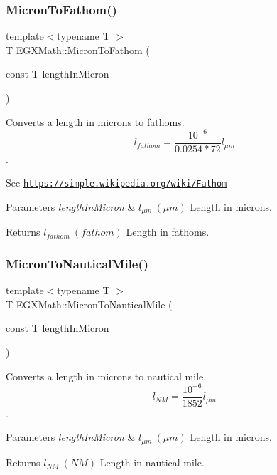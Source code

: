 \subsubsection{\texorpdfstring{Micron\+To\+Fathom()}{MicronToFathom()}}
{\footnotesize\ttfamily template$<$typename T $>$ \\
T E\+G\+X\+Math\+::\+Micron\+To\+Fathom (\begin{DoxyParamCaption}\item[{const T}]{length\+In\+Micron }\end{DoxyParamCaption})}



Converts a length in microns to fathoms. \[ l_{fathom}= \frac{10^{-6}}{0.0254 * 72} l_{\mu m} \]. 

See \href{https://simple.wikipedia.org/wiki/Fathom}{\tt https\+://simple.\+wikipedia.\+org/wiki/\+Fathom} 
\begin{DoxyParams}{Parameters}
{\em length\+In\+Micron} & $ l_{\mu m}\ (\mu m)$ Length in microns. \\
\hline
\end{DoxyParams}
\begin{DoxyReturn}{Returns}
$ l_{fathom}\ (fathom)$ Length in fathoms. 
\end{DoxyReturn}
\mbox{\label{group___e_g_x_math-_conversions-_length_conversions-_non-_s_i-_micron-_nautical_gaa3944ed4bca9dcd37c3043d44cc36bf1}} 
\subsubsection{\texorpdfstring{Micron\+To\+Nautical\+Mile()}{MicronToNauticalMile()}}
{\footnotesize\ttfamily template$<$typename T $>$ \\
T E\+G\+X\+Math\+::\+Micron\+To\+Nautical\+Mile (\begin{DoxyParamCaption}\item[{const T}]{length\+In\+Micron }\end{DoxyParamCaption})}



Converts a length in microns to nautical mile. \[ l_{NM}= \frac{10^{-6}}{1852} l_{\mu m} \]. 


\begin{DoxyParams}{Parameters}
{\em length\+In\+Micron} & $ l_{\mu m}\ (\mu m)$ Length in microns. \\
\hline
\end{DoxyParams}
\begin{DoxyReturn}{Returns}
$ l_{NM}\ (NM)$ Length in nautical mile. 
\end{DoxyReturn}
